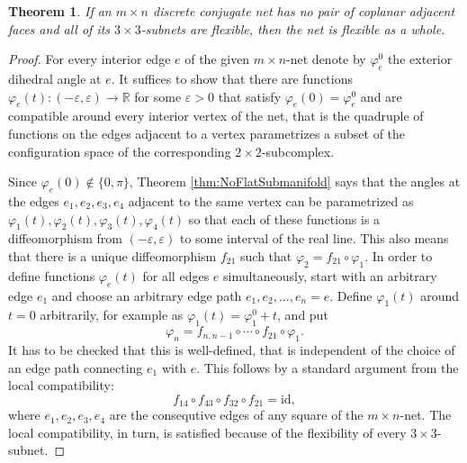 \documentclass{amsart}
\newtheorem{thm}{Theorem}
\theoremstyle{definition}
\renewcommand{\phi}{\varphi}
\newcommand\RR{\mathbb{R}}
\begin{document}
\begin{thm}
\label{thm:GlobFlex}
If an $m \times n$ discrete conjugate net has no pair of coplanar adjacent faces and all of its $3 \times 3$-subnets are flexible, then the net is flexible as a whole.
\end{thm}
\begin{proof}
For every interior edge $e$ of the given $m \times n$-net denote by $\phi_e^0$ the exterior dihedral angle at $e$.
It suffices to show that there are functions $\phi_e(t) \colon (-\varepsilon, \varepsilon) \to \RR$ for some $\varepsilon > 0$ that satisfy $\phi_e(0) = \phi_e^0$ and are compatible around every interior vertex of the net, that is the quadruple of functions on the edges adjacent to a vertex parametrizes a subset of the configuration space of the corresponding $2\times 2$-subcomplex.

Since $\phi_e(0) \notin \{0, \pi\}$, Theorem \ref{thm:NoFlatSubmanifold} says that the angles at the edges $e_1, e_2, e_3, e_4$ adjacent to the same vertex can be parametrized as $\phi_1(t), \phi_2(t), \phi_3(t), \phi_4(t)$ so that each of these functions is a diffeomorphism from $(-\varepsilon, \varepsilon)$ to some interval of the real line.
This also means that there is a unique diffeomorphism $f_{21}$ such that $\phi_2 = f_{21} \circ \phi_1$.
In order to define functions $\phi_e(t)$ for all edges $e$ simultaneously, start with an arbitrary edge $e_1$ and choose an arbitrary edge path $e_1, e_2, \ldots, e_n = e$.
Define $\phi_1(t)$ around $t=0$ arbitrarily, for example as $\phi_1(t) = \phi_1^0 + t$, and put
\[
\phi_n = f_{n,n-1} \circ \cdots \circ f_{21} \circ \phi_1.
\]
It has to be checked that this is well-defined, that is independent of the choice of an edge path connecting $e_1$ with $e$.
This follows by a standard argument from the local compatibility:
\[
f_{14} \circ f_{43} \circ f_{32} \circ f_{21} = \mathrm{id},
\]
where $e_1, e_2, e_3, e_4$ are the consequtive edges of any square of the $m \times n$-net.
The local compatibility, in turn, is satisfied because of the flexibility of every $3\times 3$-subnet.
\end{proof}
%
%
%
\end{document}
